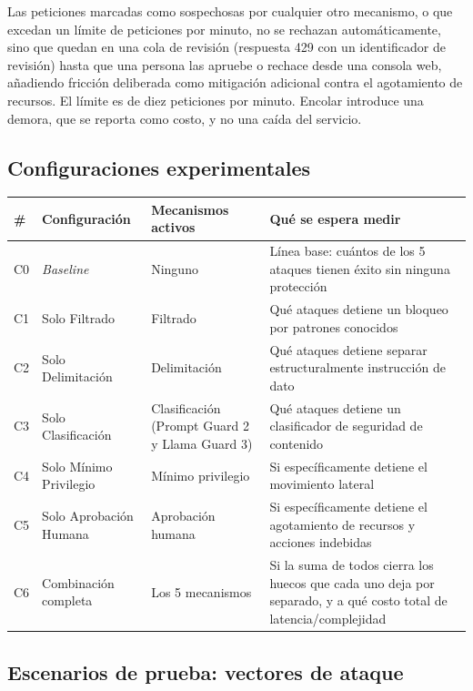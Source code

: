 \documentclass[11pt,letterpaper]{article}
\begin{document}
\begin{description}[leftmargin=0.4cm, style=nextline, itemsep=4pt]
\item[\textbf{(5) Aprobación humana.}] Las peticiones marcadas como sospechosas por cualquier otro mecanismo, o que excedan un límite de peticiones por minuto, no se rechazan automáticamente, sino que quedan en una cola de revisión (respuesta 429 con un identificador de revisión) hasta que una persona las apruebe o rechace desde una consola web, añadiendo fricción deliberada como mitigación adicional contra el agotamiento de recursos. El límite es de diez peticiones por minuto. Encolar introduce una demora, que se reporta como costo, y no una caída del servicio.
\end{description}

\subsection{Configuraciones experimentales}

\begin{center}
\small
\begin{tabular}{@{}p{1.0cm}p{2.6cm}p{3.0cm}p{6.8cm}@{}}
\toprule
\textbf{\#} & \textbf{Configuración} & \textbf{Mecanismos activos} & \textbf{Qué se espera medir} \\
\midrule
C0 & \emph{Baseline} & Ninguno & Línea base: cuántos de los 5 ataques tienen éxito sin ninguna protección \\
C1 & Solo Filtrado & Filtrado & Qué ataques detiene un bloqueo por patrones conocidos \\
C2 & Solo Delimitación & Delimitación & Qué ataques detiene separar estructuralmente instrucción de dato \\
C3 & Solo Clasificación & Clasificación (Prompt Guard 2 y Llama Guard 3) & Qué ataques detiene un clasificador de seguridad de contenido \\
C4 & Solo Mínimo Privilegio & Mínimo privilegio & Si específicamente detiene el movimiento lateral \\
C5 & Solo Aprobación Humana & Aprobación humana & Si específicamente detiene el agotamiento de recursos y acciones indebidas \\
C6 & Combinación completa & Los 5 mecanismos & Si la suma de todos cierra los huecos que cada uno deja por separado, y a qué costo total de latencia/complejidad \\
\bottomrule
\end{tabular}
\end{center}

\subsection{Escenarios de prueba: vectores de ataque}
\end{document}
